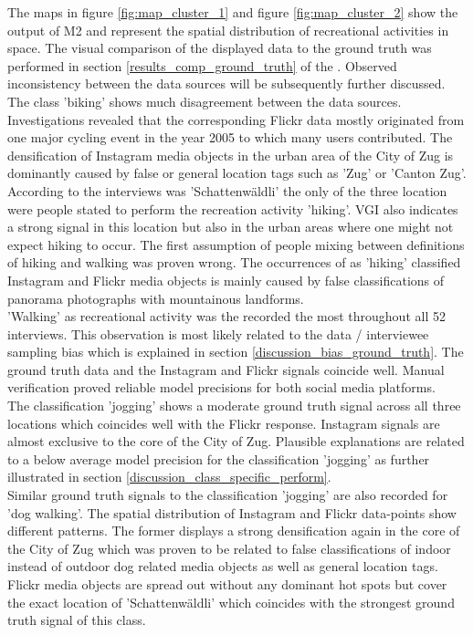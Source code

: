 The maps in figure \ref{fig:map_cluster_1} and figure \ref{fig:map_cluster_2} show the output of M2 and represent the spatial distribution of recreational activities in space. The visual comparison of the displayed data to the ground truth was performed in section \ref{results_comp_ground_truth} of the . Observed inconsistency between the data sources will be subsequently further discussed. \\
The class 'biking' shows much disagreement between the data sources. Investigations revealed that the corresponding Flickr data mostly originated from one major cycling event in the year 2005 to which many users contributed. The densification of Instagram media objects in the urban area of the City of Zug is dominantly caused by false or general location tags such as 'Zug' or 'Canton Zug'. \\
According to the interviews was 'Schattenw\"aldli' the only of the three location were people stated to perform the recreation activity 'hiking'. VGI also indicates a strong signal in this location but also in the urban areas where one might not expect hiking to occur. The first assumption of people mixing between definitions of hiking and walking was proven wrong. The occurrences of as 'hiking' classified Instagram and Flickr media objects is mainly caused by false classifications of panorama photographs with mountainous landforms. \\
'Walking' as recreational activity was the recorded the most throughout all 52 interviews. This observation is most likely related to the data / interviewee sampling bias which is explained in section \ref{discussion_bias_ground_truth}. The ground truth data and the Instagram and Flickr signals coincide well. Manual verification proved reliable model precisions for both social media platforms.\\
The classification 'jogging' shows a moderate ground truth signal across all three locations which coincides well with the Flickr response. Instagram signals are almost exclusive to the core of the City of Zug. Plausible explanations are related to a below average model precision for the classification 'jogging' as further illustrated in section \ref{discussion_class_specific_perform}. \\
Similar ground truth signals to the classification 'jogging' are also recorded for 'dog walking'. The spatial distribution of Instagram and Flickr data-points show different patterns. The former displays a strong densification again in the core of the City of Zug which was proven to be related to false classifications of indoor instead of outdoor dog related media objects as well as general location tags. Flickr media objects are spread out without any dominant hot spots but cover the exact location of 'Schattenw\"aldli' which coincides with the strongest ground truth signal of this class. \\
